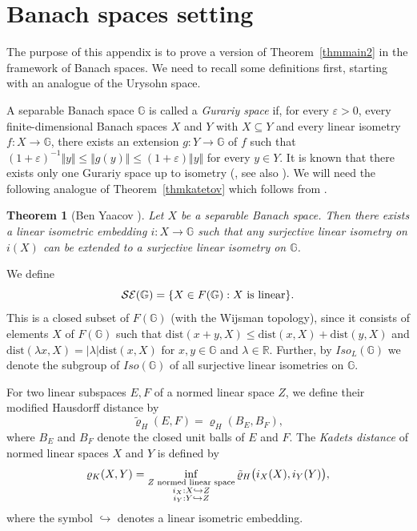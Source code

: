 \documentclass[a4paper]{amsart}
\theoremstyle{plain}
\newtheorem{theorem}{Theorem}[section]
\theoremstyle{remark}
\begin{document}
\appendix


\section{Banach spaces setting}


The purpose of this appendix is to prove a version of Theorem~\ref{thmmain2} in the framework of Banach spaces. We need to recall some definitions first, starting with an analogue of the Urysohn space.

A separable Banach space $ \mathbb{G} $ is called a \emph{Gurariy space} if, for every $ \varepsilon > 0 $, every finite-dimensional Banach spaces $ X $ and $ Y $ with $ X \subseteq Y $ and every linear isometry $ f : X \to \mathbb{G} $, there exists an extension $ g : Y \to \mathbb{G} $ of $ f $ such that $ (1 + \varepsilon)^{-1} \Vert y \Vert \leq \Vert g(y) \Vert \leq (1 + \varepsilon) \Vert y \Vert $ for every $ y \in Y $. It is known that there exists only one Gurariy space up to isometry (\cite{lusky}, see also \cite{kubsol}). We will need the following analogue of Theorem~\ref{thmkatetov} which follows from \cite[Lemma~3.8]{benyaacov}.


\begin{theorem}[Ben Yaacov \cite{benyaacov}] \label{thmbenyaacov}
Let $ X $ be a separable Banach space. Then there exists a linear isometric embedding $ i : X \to \mathbb{G} $ such that any surjective linear isometry on $ i(X) $ can be extended to a surjective linear isometry on $ \mathbb{G} $.
\end{theorem}


We define
$$ \mathcal{SE}(\mathbb{G}) = \{ X \in F(\mathbb{G}) : \textnormal{$ X $ is linear} \}. $$
This is a closed subset of $ F(\mathbb{G}) $ (with the Wijsman topology), since it consists of elements $ X $ of $ F(\mathbb{G}) $ such that $ \mathrm{dist} (x+y, X) \leq \mathrm{dist} (x, X) + \mathrm{dist} (y, X) $ and $ \mathrm{dist} (\lambda x, X) = |\lambda| \mathrm{dist} (x, X) $ for $ x, y \in \mathbb{G} $ and $ \lambda \in \mathbb{R} $. Further, by $ Iso_{L}(\mathbb{G}) $ we denote the subgroup of $ Iso(\mathbb{G}) $ of all surjective linear isometries on $ \mathbb{G} $.

For two linear subspaces $ E, F $ of a normed linear space $ Z $, we define their modified Hausdorff distance by
$$ \tilde{\varrho}_{H}(E, F) = \varrho_{H}(B_{E}, B_{F}), $$
where $ B_{E} $ and $ B_{F} $ denote the closed unit balls of $ E $ and $ F $. The \emph{Kadets distance} of normed linear spaces $ X $ and $ Y $ is defined by
$$ \varrho_{K} (X, Y) = \inf_{\substack{\textnormal{$ Z $ normed linear space}\\ i_{X} : X \hookrightarrow Z\\ i_{Y}: Y \hookrightarrow Z}} \tilde{\varrho}_{H} \big( i_{X}(X), i_{Y}(Y) \big), $$
where the symbol $ \hookrightarrow $ denotes a linear isometric embedding.
\end{document}
